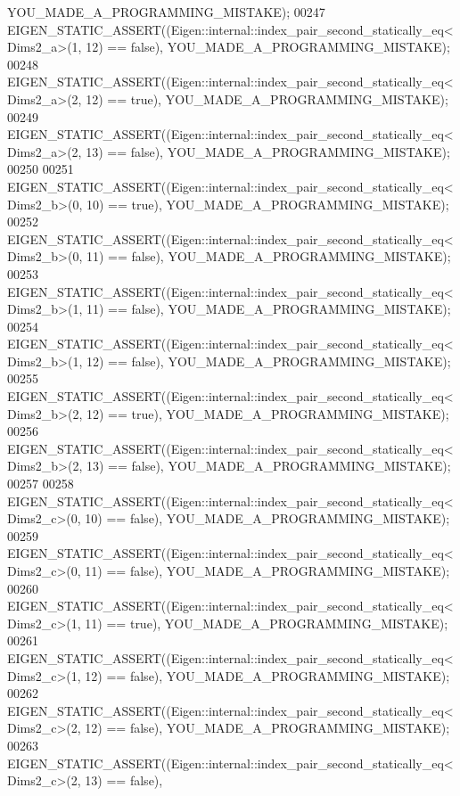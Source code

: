 \begin{DoxyCode}
      YOU\_MADE\_A\_PROGRAMMING\_MISTAKE);
00247   EIGEN\_STATIC\_ASSERT((Eigen::internal::index\_pair\_second\_statically\_eq<Dims2\_a>(1, 12) == \textcolor{keyword}{false}), 
      YOU\_MADE\_A\_PROGRAMMING\_MISTAKE);
00248   EIGEN\_STATIC\_ASSERT((Eigen::internal::index\_pair\_second\_statically\_eq<Dims2\_a>(2, 12) == \textcolor{keyword}{true}), 
      YOU\_MADE\_A\_PROGRAMMING\_MISTAKE);
00249   EIGEN\_STATIC\_ASSERT((Eigen::internal::index\_pair\_second\_statically\_eq<Dims2\_a>(2, 13) == \textcolor{keyword}{false}), 
      YOU\_MADE\_A\_PROGRAMMING\_MISTAKE);
00250 
00251   EIGEN\_STATIC\_ASSERT((Eigen::internal::index\_pair\_second\_statically\_eq<Dims2\_b>(0, 10) == \textcolor{keyword}{true}), 
      YOU\_MADE\_A\_PROGRAMMING\_MISTAKE);
00252   EIGEN\_STATIC\_ASSERT((Eigen::internal::index\_pair\_second\_statically\_eq<Dims2\_b>(0, 11) == \textcolor{keyword}{false}), 
      YOU\_MADE\_A\_PROGRAMMING\_MISTAKE);
00253   EIGEN\_STATIC\_ASSERT((Eigen::internal::index\_pair\_second\_statically\_eq<Dims2\_b>(1, 11) == \textcolor{keyword}{false}), 
      YOU\_MADE\_A\_PROGRAMMING\_MISTAKE);
00254   EIGEN\_STATIC\_ASSERT((Eigen::internal::index\_pair\_second\_statically\_eq<Dims2\_b>(1, 12) == \textcolor{keyword}{false}), 
      YOU\_MADE\_A\_PROGRAMMING\_MISTAKE);
00255   EIGEN\_STATIC\_ASSERT((Eigen::internal::index\_pair\_second\_statically\_eq<Dims2\_b>(2, 12) == \textcolor{keyword}{true}), 
      YOU\_MADE\_A\_PROGRAMMING\_MISTAKE);
00256   EIGEN\_STATIC\_ASSERT((Eigen::internal::index\_pair\_second\_statically\_eq<Dims2\_b>(2, 13) == \textcolor{keyword}{false}), 
      YOU\_MADE\_A\_PROGRAMMING\_MISTAKE);
00257 
00258   EIGEN\_STATIC\_ASSERT((Eigen::internal::index\_pair\_second\_statically\_eq<Dims2\_c>(0, 10) == \textcolor{keyword}{false}), 
      YOU\_MADE\_A\_PROGRAMMING\_MISTAKE);
00259   EIGEN\_STATIC\_ASSERT((Eigen::internal::index\_pair\_second\_statically\_eq<Dims2\_c>(0, 11) == \textcolor{keyword}{false}), 
      YOU\_MADE\_A\_PROGRAMMING\_MISTAKE);
00260   EIGEN\_STATIC\_ASSERT((Eigen::internal::index\_pair\_second\_statically\_eq<Dims2\_c>(1, 11) == \textcolor{keyword}{true}), 
      YOU\_MADE\_A\_PROGRAMMING\_MISTAKE);
00261   EIGEN\_STATIC\_ASSERT((Eigen::internal::index\_pair\_second\_statically\_eq<Dims2\_c>(1, 12) == \textcolor{keyword}{false}), 
      YOU\_MADE\_A\_PROGRAMMING\_MISTAKE);
00262   EIGEN\_STATIC\_ASSERT((Eigen::internal::index\_pair\_second\_statically\_eq<Dims2\_c>(2, 12) == \textcolor{keyword}{false}), 
      YOU\_MADE\_A\_PROGRAMMING\_MISTAKE);
00263   EIGEN\_STATIC\_ASSERT((Eigen::internal::index\_pair\_second\_statically\_eq<Dims2\_c>(2, 13) == \textcolor{keyword}{false}), 

\end{DoxyCode}
